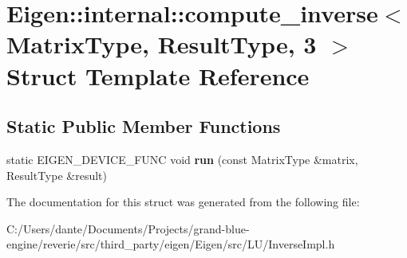 \hypertarget{struct_eigen_1_1internal_1_1compute__inverse_3_01_matrix_type_00_01_result_type_00_013_01_4}{}\section{Eigen\+::internal\+::compute\+\_\+inverse$<$ Matrix\+Type, Result\+Type, 3 $>$ Struct Template Reference}
\label{struct_eigen_1_1internal_1_1compute__inverse_3_01_matrix_type_00_01_result_type_00_013_01_4}
\subsection*{Static Public Member Functions}
\begin{DoxyCompactItemize}
\item 
\mbox{\label{struct_eigen_1_1internal_1_1compute__inverse_3_01_matrix_type_00_01_result_type_00_013_01_4_a85ff1ae68f3676b513dc50428e8a8cf6}} 
static E\+I\+G\+E\+N\+\_\+\+D\+E\+V\+I\+C\+E\+\_\+\+F\+U\+NC void {\bfseries run} (const Matrix\+Type \&matrix, Result\+Type \&result)
\end{DoxyCompactItemize}


The documentation for this struct was generated from the following file\+:\begin{DoxyCompactItemize}
\item 
C\+:/\+Users/dante/\+Documents/\+Projects/grand-\/blue-\/engine/reverie/src/third\+\_\+party/eigen/\+Eigen/src/\+L\+U/Inverse\+Impl.\+h\end{DoxyCompactItemize}
